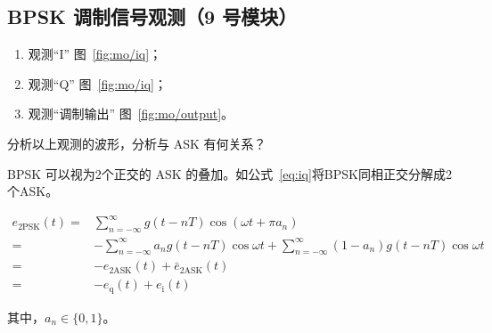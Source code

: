 \documentclass[../main]{subfiles}
\begin{document}
\subsection{BPSK 调制信号观测（9 号模块）}%
\label{sub:modem}


\begin{enumerate}
  \item 观测“I” 图~\ref{fig:mo/iq}；
  \item 观测“Q” 图~\ref{fig:mo/iq}；
  \item 观测“调制输出” 图~\ref{fig:mo/output}。
\end{enumerate}

\begin{Exercise}
  分析以上观测的波形，分析与 ASK 有何关系？
\end{Exercise}

\begin{Answer}
  BPSK 可以视为2个正交的 ASK 的叠加。如公式~\ref{eq:iq}将BPSK同相正交分解成2
  个ASK。
\end{Answer}

\begin{align}
  \label{eq:iq}
  e_\mathrm{2PSK}(t) = & \sum^\infty_{n = -\infty} g(t - nT)\cos(\omega t + \pi a_n)\\
  = & -\sum^\infty_{n = -\infty} a_n g(t - nT)\cos\omega t + \sum^\infty_{n = -\infty} (1 -  a_n) g(t - nT)\cos\omega t\\
  = & -e_\mathrm{2ASK}(t) + \bar{e}_\mathrm{2ASK}(t)\\
  = & -e_\mathrm{q}(t) + e_\mathrm{i}(t)
\end{align}

其中，$a_n \in \{0, 1\}$。
\end{document}
